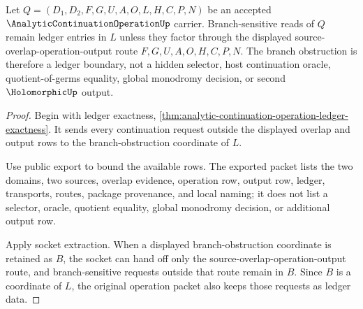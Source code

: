 \begin{theorem}
\label{thm:analytic-continuation-operation-branch-ledger-nonescape}
Let $Q=(D_1,D_2,F,G,U,A,O,L,H,C,P,N)$ be an accepted $\AnalyticContinuationOperationUp$ carrier. Branch-sensitive reads of $Q$ remain ledger entries in $L$ unless they factor through the displayed source-overlap-operation-output route $F,G,U,A,O,H,C,P,N$. The branch obstruction is therefore a ledger boundary, not a hidden selector, host continuation oracle, quotient-of-germs equality, global monodromy decision, or second $\HolomorphicUp$ output.
\end{theorem}
\begin{proof}
Begin with ledger exactness, \autoref{thm:analytic-continuation-operation-ledger-exactness}. It sends every continuation request outside the displayed overlap and output rows to the branch-obstruction coordinate of $L$.

Use public export to bound the available rows. The exported packet lists the two domains, two sources, overlap evidence, operation row, output row, ledger, transports, routes, package provenance, and local naming; it does not list a selector, oracle, quotient equality, global monodromy decision, or additional output row.

Apply socket extraction. When a displayed branch-obstruction coordinate is retained as $B$, the socket can hand off only the source-overlap-operation-output route, and branch-sensitive requests outside that route remain in $B$. Since $B$ is a coordinate of $L$, the original operation packet also keeps those requests as ledger data.
\end{proof}

